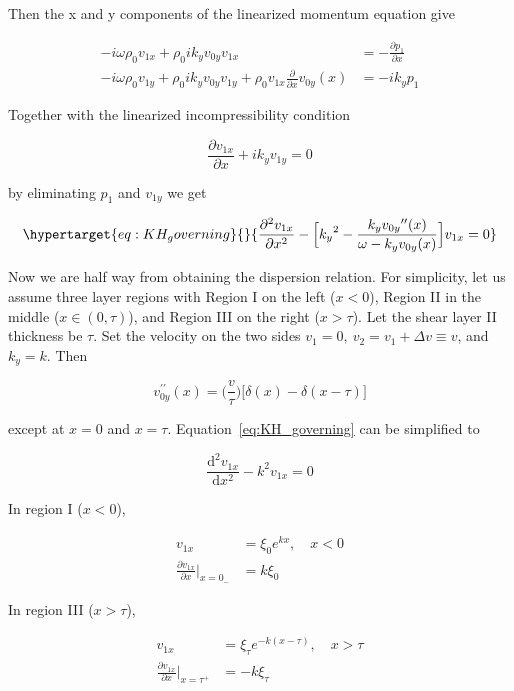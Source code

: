 \documentclass[
  notoc %
]{tufte-book}
\begin{document}
Then the x and y components of the linearized momentum equation give

\[
\begin{aligned}
-i\omega \rho_0 v_{1x} +\rho_0 i k_y v_{0y}v_{1x} &= -\frac{\partial p_1}{\partial x} \\
-i\omega \rho_0 v_{1y} + \rho_0 i k_y v_{0y}v_{1y} + \rho_0 v_{1x}\frac{\partial}{\partial x}v_{0y}(x) &= -ik_y p_1
\end{aligned}
\]

Together with the linearized incompressibility condition

\[
\frac{\partial v_{1x}}{\partial x} + ik_y v_{1y}  = 0
\]

by eliminating \(p_1\) and \(v_{1y}\) we get

\begin{equation}\protect\hypertarget{eq:KH_governing}{}{
\frac{\partial^2 v_{1x}}{\partial x^2} - \Big[ {k_y}^2 - \frac{k_y {v_{0y}}^{\prime\prime}(x)}{\omega-k_y v_{0y}(x)} \Big]v_{1x} = 0
}\label{eq:KH_governing}\end{equation}

Now we are half way from obtaining the dispersion relation. For
simplicity, let us assume three layer regions with Region I on the left
(\(x<0\)), Region II in the middle (\(x\in(0,\tau)\)), and Region III on
the right (\(x>\tau\)). Let the shear layer II thickness be \(\tau\).
Set the velocity on the two sides
\(v_1 = 0,\ v_2 = v_1+\Delta v \equiv v\), and \(k_y=k\). Then

\[
v_{0y}^{\prime\prime}(x) = \Big(\frac{v}{\tau}\Big)\big[ \delta(x) - \delta(x-\tau)\big]
\]

except at \(x=0\) and \(x=\tau\). Equation~\ref{eq:KH_governing} can be
simplified to

\[
\frac{\mathrm{d}^2 v_{1x}}{\mathrm{d}x^2}-k^2 v_{1x} = 0
\]

In region I (\(x<0\)),

\[
\begin{aligned}
v_{1x} &= \xi_0 e^{kx},\quad x<0 \\
\frac{\partial v_{1x}}{\partial x}\big|_{x=0_-} &= k\xi_0
\end{aligned}
\]

In region III (\(x>\tau\)),

\[
\begin{aligned}
v_{1x} &= \xi_\tau e^{-k(x-\tau)},\quad x>\tau \\
\frac{\partial v_{1x}}{\partial x}\big|_{x=\tau^+} &= -k\xi_\tau
\end{aligned}
\]
\end{document}
